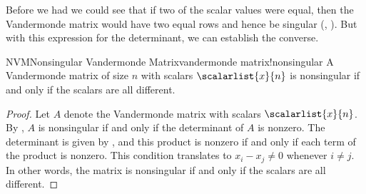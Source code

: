 %
Before we had  we could see that if two of the scalar values were equal, then the Vandermonde matrix would have two equal rows and hence be singular (, ).  But with this expression for the determinant, we can establish the converse.
%
\begin{theorem}{NVM}{Nonsingular Vandermonde Matrix}{vandermonde matrix!nonsingular}
A Vandermonde matrix of size $n$ with scalars $\scalarlist{x}{n}$ is nonsingular if and only if the scalars are all different.
\end{theorem}
%
\begin{proof}
%
Let $A$ denote the Vandermonde matrix with scalars $\scalarlist{x}{n}$.  By , $A$ is nonsingular if and only if the determinant of $A$ is nonzero.  The determinant is given by , and this product is nonzero if and only if each term of the product is nonzero.  This condition translates to $x_i-x_j\neq 0$ whenever $i\neq j$.  In other words, the matrix is nonsingular if and only if the scalars are all different.
%
\end{proof}
%  
